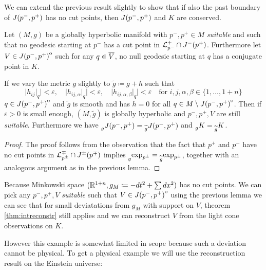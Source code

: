 We can extend the previous result slightly to show that if also the past boundary of $J(p^-,p^+)$ has no cut points, then $J(p^-,p^+)$ and $K$ are conserved.
\begin{corollary}\label{cor:suitablestable}
    Let $(M,g)$ be a globally hyperbolic manifold with $p^-,p^+\in M$ \emph{suitable} and such that no geodesic starting at $p^-$ has a cut point in ${\mathcal{L}}^+_{p^-}\cap J^-(p^+)$. Furthermore let $V\in {\kern0ptJ(p^-,p^+)}^{\mathrm{o}}$ such for any $q\in {\overline{V}}$, no null geodesic starting at $q$ has a conjugate point in $K$.
    
    If we vary the metric $g$ slightly to $\widetilde{g}\coloneqq g+h$ such that 
    \[
        \lvert h_{ij}\rvert_q \rvert <\varepsilon, \quad \lvert h_{ij,\alpha}\rvert_q \rvert <\varepsilon, \quad \lvert h_{ij,\alpha,\beta}\rvert_q \rvert <\varepsilon \quad \text{for } i,j,\alpha,\beta\in \{1,\dots, 1+n\}
    \] $q\in {\kern0ptJ(p^-,p^+)}^{\mathrm{o}}$
    and $\widetilde{g}$ is smooth and has $h=0$ for all $q\in M\setminus {\kern0ptJ(p^-,p^+)}^{\mathrm{o}}$. Then if $\varepsilon>0$ is small enough, $(M,\widetilde{g})$ is globally hyperbolic and $p^-,p^+,V$ are still \emph{suitable}. Furthermore we have $\prescript{}{g}{J(p^-,p^+)}=\prescript{}{\widetilde{g}}{J(p^-,p^+)}$ and $\prescript{}{g}{K}=\prescript{}{\widetilde{g}}{K}$.
\end{corollary}
\begin{proof}
    The proof follows from the observation that the fact that $p^+$ and $p^-$ have no cut points in ${\mathcal{L}}^\mp_{p^\pm} \cap J^\pm(p^\mp)$ implies $\prescript{}{g}{\exp_{p^\pm}}= \prescript{}{\widetilde{g}}{\exp_{p^\pm}}$, together with an analogous argument as in the previous lemma.
\end{proof}

\begin{example}
    Because Minkowski space $(\mathbb{R}^{1+n}, g_M\coloneqq -dt^2 + \sum dx^2)$ has no cut points. We can pick any $p^-,p^+,V$ \emph{suitable} such that $V\in {\kern0ptJ(p^-,p^+)}^{\mathrm{o}}$ using the previous lemma we can see that for small deviatations from $g_M$ with support on $V$, theorem \ref{thm:intreconstr} still applies and we can reconstruct $V$ from the light cone observations on $K$.
\end{example}



However this example is somewhat limited in scope because such a deviation cannot be physical. To get a physical example we will use the reconstruction result on the Einstein universe:

